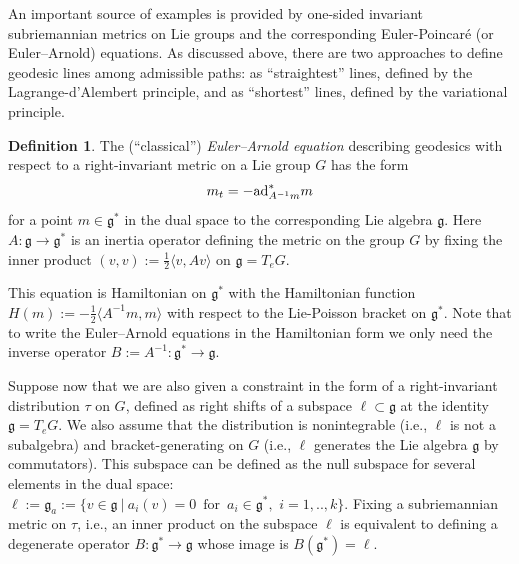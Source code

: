 \documentclass[11pt]{article}
\theoremstyle{definition}
\newtheorem{definition}[lemma]{Definition}
\newcounter{ai}
\begin{document}

An important source of examples  is provided by one-sided invariant subriemannian metrics on Lie groups
and the corresponding Euler-Poincar\'e (or Euler--Arnold) equations. As discussed above, 
there are two approaches to define geodesic lines among admissible paths: as ``straightest'' lines, 
defined by the Lagrange-d'Alembert principle,  and as ``shortest'' lines, defined by the variational principle. 

\begin{definition}
The  (``classical'') {\it Euler--Arnold equation} describing geodesics with respect to a right-invariant metric on a Lie group $G$ has the form
$$
 m_t= -{\rm ad}^*_{A^{-1}m}m
 $$
 for a point $m\in \mathfrak{g}^*$ in the dual space to the corresponding Lie algebra $\mathfrak{g}$. Here 
 $A:\mathfrak{g}\to\mathfrak{g}^*$ is an inertia operator  defining the metric on the group $G$
 by fixing the inner product $( v,v) :=\frac 12 \langle v,Av\rangle$ on  $\mathfrak{g}=T_eG$. 
 \end{definition}

This equation is Hamiltonian on 
 $\mathfrak{g}^*$ with the Hamiltonian function $H(m):=-\frac 12 \langle A^{-1}m, m\rangle$ with respect to the Lie-Poisson bracket on $\mathfrak{g}^*$. Note that to write the Euler--Arnold equations in the Hamiltonian form we only need the inverse operator $B:=A^{-1}: \mathfrak{g}^*\to\mathfrak{g}$. 
\medskip
 
Suppose now that we are also given a constraint in the form of a right-invariant distribution $\tau$ on $G$, defined as right shifts of a subspace $\ell\subset \mathfrak{g}$ at the identity $\mathfrak{g}=T_eG$. We also assume that the distribution is nonintegrable (i.e., $\ell$ is not a subalgebra) and bracket-generating on $G$ (i.e., $\ell$ generates the Lie algebra $\mathfrak{g}$ by commutators). This subspace can be defined as the null subspace for 
several elements in the dual space: $\ell:=\mathfrak{g}_a:=\{v\in \mathfrak{g}~|~a_i(v)=0\,\text{ for }\, a_i\in \mathfrak{g}^*,\,\,
 i=1,..,k\}$. Fixing a subriemannian metric on $\tau$, i.e., an inner product on the subspace $\ell$ is equivalent to defining a degenerate operator $B: \mathfrak{g}^*\to\mathfrak{g}$ whose image is $B(\mathfrak{g}^*)=\ell$.
\end{document}
